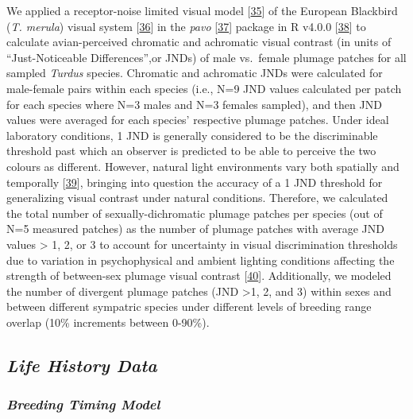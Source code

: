 \documentclass[
  a4paper,
]{article}
\begin{document}
We applied a receptor-noise limited visual model
{[}\protect\hyperlink{ref-vorobyev1998}{35}{]} of the European Blackbird
(\emph{T. merula}) visual system
{[}\protect\hyperlink{ref-hart2000}{36}{]} in the \emph{pavo}
{[}\protect\hyperlink{ref-maia2019}{37}{]}⁠ package in R v4.0.0
{[}\protect\hyperlink{ref-rcoreteam2020}{38}{]}⁠ to calculate
avian-perceived chromatic and achromatic visual contrast (in units of
``Just-Noticeable Differences'',or JNDs) of male vs.~female plumage
patches for all sampled \emph{Turdus} species. Chromatic and achromatic
JNDs were calculated for male-female pairs within each species (i.e.,
N=9 JND values calculated per patch for each species where N=3 males and
N=3 females sampled), and then JND values were averaged for each
species' respective plumage patches. Under ideal laboratory conditions,
1 JND is generally considered to be the discriminable threshold past
which an observer is predicted to be able to perceive the two colours as
different. However, natural light environments vary both spatially and
temporally {[}\protect\hyperlink{ref-endler1993}{39}{]}⁠, bringing into
question the accuracy of a 1 JND threshold for generalizing visual
contrast under natural conditions. Therefore, we calculated the total
number of sexually-dichromatic plumage patches per species (out of N=5
measured patches) as the number of plumage patches with average JND
values \textgreater{} 1, 2, or 3 to account for uncertainty in visual
discrimination thresholds due to variation in psychophysical and ambient
lighting conditions affecting the strength of between-sex plumage visual
contrast {[}\protect\hyperlink{ref-kemp2015}{40}{]}⁠. Additionally, we
modeled the number of divergent plumage patches (JND \textgreater1, 2,
and 3) within sexes and between different sympatric species under
different levels of breeding range overlap (10\% increments between
0-90\%).

\hypertarget{life-history-data}{%
\subsection{\texorpdfstring{\emph{Life History
Data}}{Life History Data}}\label{life-history-data}}

\hypertarget{breeding-timing-model}{%
\subsubsection{\texorpdfstring{\emph{Breeding Timing
Model}}{Breeding Timing Model}}\label{breeding-timing-model}}
\end{document}
